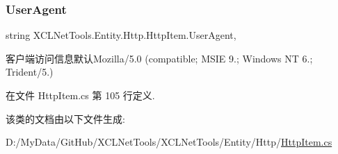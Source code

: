 \subsubsection{\texorpdfstring{User\+Agent}{UserAgent}}
{\footnotesize\ttfamily string X\+C\+L\+Net\+Tools.\+Entity.\+Http.\+Http\+Item.\+User\+Agent\hspace{0.3cm}{\ttfamily [get]}, {\ttfamily [set]}}



客户端访问信息默认\+Mozilla/5.0 (compatible; M\+S\+IE 9.; Windows NT 6.; Trident/5.) 



在文件 Http\+Item.\+cs 第 105 行定义.



该类的文档由以下文件生成\+:\begin{DoxyCompactItemize}
\item 
D\+:/\+My\+Data/\+Git\+Hub/\+X\+C\+L\+Net\+Tools/\+X\+C\+L\+Net\+Tools/\+Entity/\+Http/\hyperlink{_http_item_8cs}{Http\+Item.\+cs}\end{DoxyCompactItemize}
